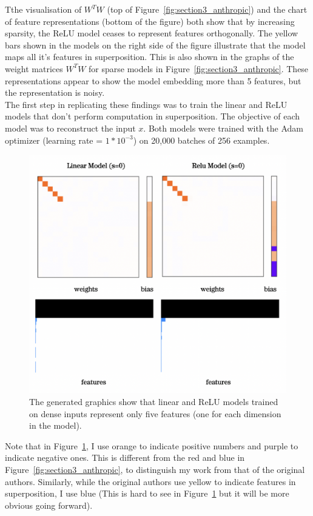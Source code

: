 \documentclass{article} %
\begin{document}
Tthe visualisation of $W^{T}W$ (top of Figure~\ref{fig:section3_anthropic}) and the 
chart of feature representations (bottom of the figure) both show that by increasing sparsity, the 
ReLU model ceases to represent features orthogonally. The yellow bars shown in the models
on the right side of the figure illustrate that the model maps all it's features 
in superposition. This is also shown in the graphs of the weight matrices $W^{T}W$ for
sparse models in Figure~\ref{fig:section3_anthropic}. These 
representations appear to show the model embedding more than 5 features, but 
the representation is noisy.\\ 

The first step in replicating these findings was to train the linear and ReLU
models that don't perform computation in superposition. The
objective of each model was to reconstruct the input $x$. Both 
models were trained with the Adam optimizer (learning rate = $1*10^{-3}$) on 
20,000 batches of 256 examples.

\begin{figure}[h]
    \centering
    \includegraphics[width=0.4\linewidth]{demonstrating_superposition/images/relu_linear_0_sparsity.png}
    \captionsetup{font=footnotesize, width=0.7\linewidth} %
    \caption{The generated graphics show that linear and ReLU models trained on
    dense inputs represent only five features (one for each dimension in the model).}
    \label{fig:relu_linear_0}
\end{figure}

Note that in Figure~\ref{fig:relu_linear_0}, I use orange to indicate
positive numbers and purple to indicate negative ones. This is different from
the red and blue in Figure~\ref{fig:section3_anthropic}, to distinguish my work 
from that of the original authors. Similarly, while the original authors use 
yellow to indicate features in superposition, I use blue (This is hard to see in 
Figure~\ref{fig:relu_linear_0} but it will be more obvious going forward).
\end{document}
